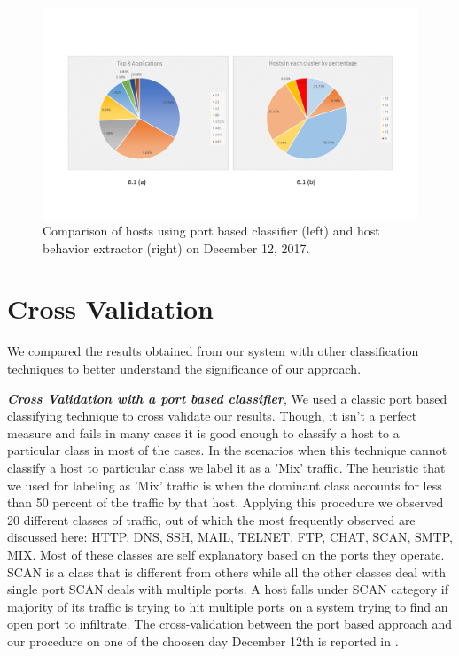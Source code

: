 \begin{figure}[t]
	\centerline{\includegraphics[trim=2cm 2cm 2cm 2cm, scale = 0.5]{dec12-port-behaviors.pdf}}
	\caption{Comparison of hosts using port based classifier (left) and host behavior extractor (right) on December 12, 2017.}%
\end{figure}


\section{Cross Validation} \label{cross_validation}
We compared the results obtained from our system with other classification techniques to better understand the significance of our approach.

\textbf{\textit{Cross Validation with a port based classifier}}, We used a classic port based classifying technique to cross validate our results. Though, it isn't a perfect measure and fails in many cases it is good enough to classify a host to a particular class in most of the cases.
In the scenarios when this technique cannot classify a host to particular class we label it as a 'Mix' traffic. The heuristic that we used for labeling as 'Mix' traffic is when the dominant class accounts for less than 50 percent of the traffic by that host. Applying this procedure we observed 20 different classes of traffic, out of which the most frequently observed are discussed here: HTTP, DNS, SSH, MAIL, TELNET, FTP, CHAT, SCAN, SMTP, MIX. Most of these classes are self explanatory based on the ports they operate. SCAN is a class that is different from others while all the other classes deal with single port SCAN deals with multiple ports. A host falls under SCAN category if majority of its traffic is trying to hit multiple ports on a system trying to find an open port to infiltrate. The cross-validation between the port based approach and  our procedure on one of the choosen day December 12th is reported in .

